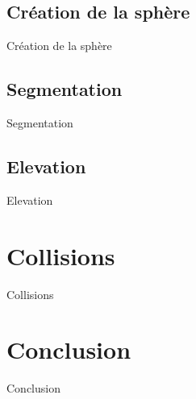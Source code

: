 \documentclass{beamer}
\begin{document}
\subsection{Création de la sphère}
\begin{frame}{Création de la sphère}

\end{frame}

\subsection{Segmentation}
\begin{frame}{Segmentation}

\end{frame}
\subsection{Elevation}
\begin{frame}{Elevation}

\end{frame}


\section{Collisions}
\begin{frame}{Collisions}

\end{frame}



\section{Conclusion}
\begin{frame}{Conclusion}

\end{frame}
\end{document}
